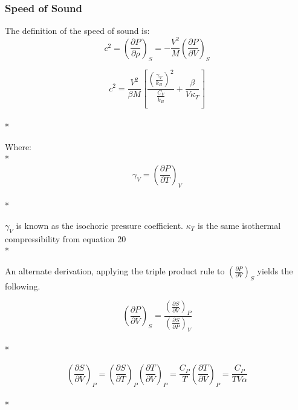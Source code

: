 \documentclass[9pt,bestpractices]{livecoms}
\begin{document}

\subsubsection{Speed of Sound}
The definition of the speed of sound is\cite{sos}:
\begin{equation}c^2 = \left(\frac{\partial P}{\partial \rho}\right)_{S} = -\frac{V^2}{M}\left(\frac{\partial P}{\partial V}\right)_{S}\end{equation}


\begin{equation}c^2 = \frac{V^2}{\beta M}\left[\frac{\left(\frac{\gamma_V}{k_B}\right)^2}{\frac{C_V}{k_B}} + \frac{\beta}{V \kappa_T}\right]\end{equation}\\*

Where:\\*
\begin{equation}\gamma_V = \left(\frac{\partial P}{\partial T}\right)_{V}\end{equation}\\*

 $\gamma_V$ is known as the isochoric pressure coefficient. $\kappa_T$ is the same isothermal compressibility from equation 20\\*

An alternate derivation, applying the triple product rule to $\left(\frac{\partial P}{\partial V}\right)_{S}$ yields the following.

\begin{equation}\left(\frac{\partial P}{\partial V}\right)_{S} = \frac{\left(\frac{\partial S}{\partial V}\right)_{P}}{\left(\frac{\partial S}{\partial P}\right)_{V}}\end{equation}\\*

\begin{equation}\left(\frac{\partial S}{\partial V}\right)_{P} = \left(\frac{\partial S}{\partial T}\right)_{P} \left(\frac{\partial T}{\partial V}\right)_{P} = \frac{C_P}{T} \left(\frac{\partial T}{\partial V}\right)_{P} = \frac{C_P}{T V \alpha}\end{equation}\\*
\end{document}
